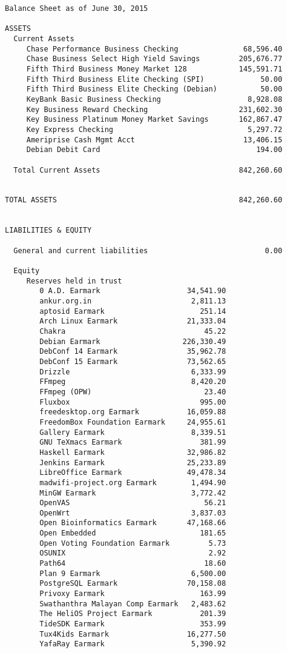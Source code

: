 \documentclass[letterpaper]{report}
\begin{document}
\begin{verbatim}
Balance Sheet as of June 30, 2015

ASSETS
  Current Assets
     Chase Performance Business Checking               68,596.40
     Chase Business Select High Yield Savings         205,676.77
     Fifth Third Business Money Market 128            145,591.71
     Fifth Third Business Elite Checking (SPI)             50.00
     Fifth Third Business Elite Checking (Debian)          50.00
     KeyBank Basic Business Checking                    8,928.08
     Key Business Reward Checking                     231,602.30
     Key Business Platinum Money Market Savings       162,867.47
     Key Express Checking                               5,297.72
     Ameriprise Cash Mgmt Acct                         13,406.15
     Debian Debit Card                                    194.00

  Total Current Assets                                842,260.60


TOTAL ASSETS                                          842,260.60


LIABILITIES & EQUITY

  General and current liabilities                           0.00

  Equity
     Reserves held in trust
        0 A.D. Earmark                    34,541.90
        ankur.org.in                       2,811.13
        aptosid Earmark                      251.14
        Arch Linux Earmark                21,333.04
        Chakra                                45.22
        Debian Earmark                   226,330.49
        DebConf 14 Earmark                35,962.78
        DebConf 15 Earmark                73,562.65
        Drizzle                            6,333.99
        FFmpeg                             8,420.20
        FFmpeg (OPW)                          23.40
        Fluxbox                              995.00
        freedesktop.org Earmark           16,059.88
        FreedomBox Foundation Earmark     24,955.61
        Gallery Earmark                    8,339.51
        GNU TeXmacs Earmark                  381.99
        Haskell Earmark                   32,986.82
        Jenkins Earmark                   25,233.89
        LibreOffice Earmark               49,478.34
        madwifi-project.org Earmark        1,494.90
        MinGW Earmark                      3,772.42
        OpenVAS                               56.21
        OpenWrt                            3,837.03
        Open Bioinformatics Earmark       47,168.66
        Open Embedded                        181.65
        Open Voting Foundation Earmark         5.73
        OSUNIX                                 2.92
        Path64                                18.60
        Plan 9 Earmark                     6,500.00
        PostgreSQL Earmark                70,158.08
        Privoxy Earmark                      163.99
        Swathanthra Malayan Comp Earmark   2,483.62
        The HeliOS Project Earmark           201.39
        TideSDK Earmark                      353.99
        Tux4Kids Earmark                  16,277.50
        YafaRay Earmark                    5,390.92


\end{verbatim}
\end{document}
